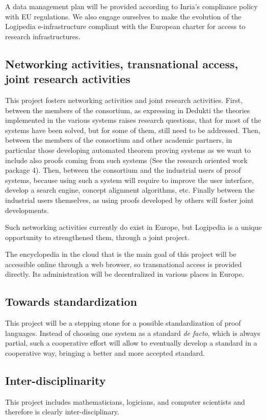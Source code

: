 A data management plan will be provided according to Inria’s
compliance policy with EU regulations. We also engage ourselves to
make the evolution of the {\sc Logipedia} e-infrastructure compliant
with the European charter for access to research infrastructures.

\subsection{Networking activities, transnational access, joint
  research activities}

This project fosters networking activities and joint research
activities. First, between the members of the consortium, as
expressing in {\sc Dedukti} the theories implemented in the various
systems raises research questions, that for most of the systems have
been solved, but for some of them, still need to be addressed.  Then,
between the members of the consortium and other academic partners, in
particular those developing automated theorem proving systems as we
want to include also proofs coming from such systems (See the research
oriented work package 4). Then, between the consortium and the
industrial users of proof systems, because using such a system will
require to improve the user interface, develop a search engine,
concept alignment algorithms, etc.  Finally between the industrial
users themselves, as using proofs developed by others will foster joint
developments.

Such networking activities currently do exist in Europe, but {\sc
  Logipedia} is a unique opportunity to strengthened them, through a
joint project.

The encyclopedia in the cloud that is the main goal of this project
will be accessible online through a web browser, so transnational
access is provided directly. Its administration will be decentralized
in various places in Europe.

\subsection{Towards standardization}
This project will be a stepping stone for a possible standardization
of proof languages. Instead of choosing one system as a standard {\em
de facto}, which is always partial, such a cooperative effort will
allow to eventually develop a standard in a cooperative way, bringing
a better and more accepted standard.

\subsection{Inter-disciplinarity}
This project includes mathematicians, logicians, and computer
scientists and therefore is clearly inter-disciplinary.

 











